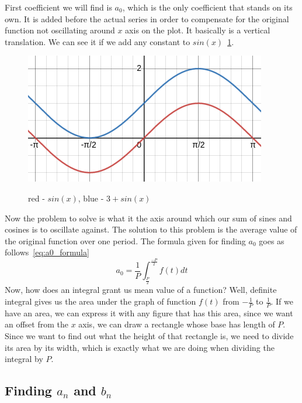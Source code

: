 \documentclass{article}
\begin{document}
    First coefficient we will find is $a_0$, which is the only coefficient that 
    stands on its own. It is added before the actual series in order to compensate
    for the original function not oscillating around $x$ axis on the plot. It 
    basically is a vertical translation. We can see it if we add any constant
    to $sin(x)$~\ref{fig:sine_translation}.
    \begin{figure}[H]
        \caption{red - $sin(x)$, blue - $3 + sin(x)$}
        \centering
        \includegraphics[width=0.5\linewidth]{translated_vanilla_sinewave}
        \label{fig:sine_translation}
    \end{figure}
    Now the problem to solve is what it the axis around which our sum of sines
    and cosines is to oscillate against. The solution to this problem is the average
    value of the original function over one period. The formula given for finding
    $a_0$ goes as follows~\eqref{eq:a0_formula}
    \begin{equation}\label{eq:a0_formula}
        a_0 = \frac{1}{P}\int_{\frac{P}{2}}^{\frac{-P}{2}}f(t)dt
    \end{equation}
    Now, how does an integral grant us mean value of a function? Well, definite
    integral gives us the area under the graph of function $f(t)$ from 
    $-\frac{1}{P}$ to $\frac{1}{P}$. If we have an area, we can express it with 
    any figure that has this area, since we want an offset from the $x$ axis, 
    we can draw a rectangle whose base has length of $P$. Since we want to find
    out what the height of that rectangle is, we need to divide its area by its
    width, which is exactly what we are doing when dividing the integral by $P$.

\subsection{Finding $a_n$ and $b_n$}
\end{document}
